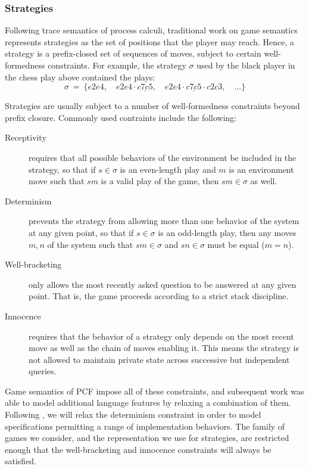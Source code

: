 \documentclass[acmsmall,timestamp,review,anonymous]{acmart}
\begin{document}

\subsubsection{Strategies} %

Following trace semantics of process calculi,
traditional work on game semantics
represents strategies as
the set of positions that the player may reach.
Hence,
a strategy is a prefix-closed set of sequences of moves,
subject to certain well-formedness constraints.
For example,
the strategy $\sigma$ used by
the black player in the chess play above
contained the plays:
\[
  \sigma \: = \: \{
    e2e4, \quad
    e2e4 \cdot \underline{c7c5}, \quad
    e2e4 \cdot \underline{c7c5} \cdot c2c3, \quad
    \ldots
  \}
\]

Strategies are usually subject to a number
of well-formedness constraints beyond prefix closure.
Commonly used contraints include the following:
\begin{description}
\item[Receptivity]
  requires that all possible behaviors of the environment
  be included in the strategy,
  so that if $s \in \sigma$ is an even-length play and
  $m$ is an environment move such that $sm$ is a valid play of the game,
  then $sm \in \sigma$ as well.
\item[Determinism]
  prevents the strategy from allowing
  more than one behavior of the system at any given point,
  so that if $s \in \sigma$ is an odd-length play,
  then any moves $m, n$ of the system
  such that $sm \in \sigma$ and $sn \in \sigma$
  must be equal ($m = n$).
\item[Well-bracketing]
  only allows the most recently asked question
  to be answered at any given point.
  That is,
  the game proceeds according to a strict stack discipline.
\item[Innocence]
  requires that the behavior of a strategy
  only depends on the most recent move
  as well as the chain of moves enabling it.
  This means the strategy is not allowed to maintain
  private state across
  successive but independent queries.
\end{description}
Game semantics of PCF \cite{pcfajm,pcfho,gamesem99}
impose all of these constraints,
and subsequent work was able to model additional language features
by relaxing a combination of them.
Following \cite{gsnondet},
we will relax the determinism constraint in order
to model specifications permitting
a range of implementation behaviors.
The family of games we consider,
and the representation we use for strategies,
are restricted enough that
the well-bracketing and innocence constraints
will always be satisfied.
\end{document}
